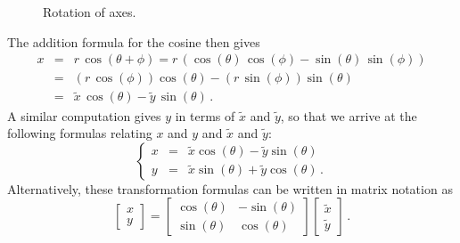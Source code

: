 \begin{figure}
\centering
\centerline{
\hspace{0.1cm}
}
\caption{Rotation of axes. }
\end{figure}

The addition formula for the cosine then gives
$$
\begin{array}{rcl}
x & = & r\,\cos(\theta+\phi)=r\,\left(\cos(\theta)\,\cos(\phi)-\sin(\theta)\,\sin(\phi)\right)\\[.2cm]
 & = & \left(r\,\cos(\phi)\right)\cos(\theta)-\left(r\,\sin(\phi)\right)\sin(\theta)\\[.2cm]
&=&\widetilde{x}\,\cos(\theta)-\widetilde{y}\,\sin(\theta)\,. 
\end{array}
$$
A similar computation gives $y$ in terms of $\widetilde{x}$ and $\widetilde{y}$, so that we arrive at the following formulas relating $x$ and $y$ and $\widetilde{x}$ and $\widetilde{y}$:
\begin{equation}
\left\{ 
\begin{array}{rcl}
x & = & \widetilde{x}\cos(\theta)-\widetilde{y}\sin(\theta)\\[.2cm]
y & = & \widetilde{x}\sin(\theta)+\widetilde{y}\cos(\theta)\,. 
\end{array}\right.
\label{rot2}
\end{equation}
\ifanalysis
Alternatively, these transformation formulas can be written in matrix notation as
$$
\begin{bmatrix}
x\\
y
\end{bmatrix}=\begin{bmatrix}
\cos(\theta)&-\sin(\theta)\\
\sin(\theta)&\cos(\theta)
\end{bmatrix}\begin{bmatrix}
\widetilde{x}\\
\widetilde{y}
\end{bmatrix}\,.
$$
\fi

